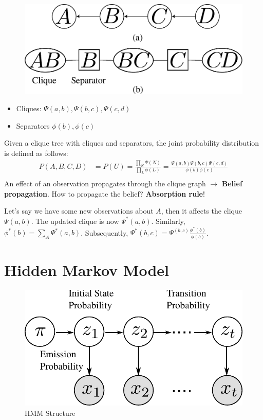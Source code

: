 \begin{figure}[h]
	\centering
	\includegraphics[scale=0.5]{./images/hmm/cascade.pdf}
\end{figure}

\begin{itemize}
	\item Cliques: $\Psi(a,b), \Psi(b,c), \Psi(c,d)$
	\item Separators $\phi(b), \phi(c)$
\end{itemize}
Given a clique tree with cliques and separators, the joint probability distribution is defined as follows:
\begin{align*}
	P(A,B,C,D) &= P(U) = \frac{\prod_N \Psi(N)}{\prod_L\phi(L)}= \frac{ \Psi(a,b)\Psi(b,c)\Psi(c,d)}{\phi(b)\phi(c)}\\
\end{align*}
An effect of an observation propagates through the clique graph $\to$ \textbf{Belief propagation}. How to propagate the belief? \textbf{Absorption rule}!

Let's say we have some new observations about $A$, then it affects the clique $\Psi(a,b)$. The updated clique is now $\Psi^*(a,b)$. Similarly, $\phi^*(b) = \sum_A\Psi^*(a,b)$. Subsequently, $\Psi^*(b,c) = \Psi^(b,c)\frac{\phi^*(b)}{\phi(b)}$.



\chapter{Hidden Markov Model}
\begin{figure}[h]
	\begin{center}
		\includegraphics[scale=0.7]{./images/hmm/hmm_figure.pdf}
	\end{center}
	\caption{HMM Structure}
	\label{fig:HMM}
\end{figure}

